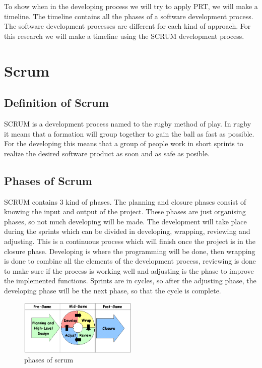To show when in the developing process we will try to apply PRT, we will make a timeline. The timeline contains all the phases of a software development process. The software development processes are different for each kind of approach. For this research we will make a timeline using the SCRUM development process.
\section{Scrum}
\subsection{Definition of Scrum}
SCRUM is a development process named to the rugby method of play. In rugby it means that a formation will group together to gain the ball as fast as possible. For the developing this means that a group of people work in short sprints to realize the desired software product as soon and as safe as posible.
\subsection{Phases of Scrum}
SCRUM contains 3 kind of phases. The planning and closure phases consist of knowing the input and output of the project. These phases are just organising phases, so not much developing will be made. The development will take place during the sprints which can be divided in developing, wrapping, reviewing and adjusting. This is a continuous process which will finish once the project is in the closure phase. Developing is where the programming will be done, then wrapping is done to combine all the elements of the development process, reviewing is done to make sure if the process is working well and adjusting is the phase to improve the implemented functions. Sprints are in cycles, so after the adjusting phase, the developing phase will be the next phase, so that the cycle is complete.

\begin{figure}[h]
\begin{center}
	\includegraphics[width=0.5\textwidth]{Figures/diagram01.png}
\end{center}
	\caption{phases of scrum}

\end{figure}


